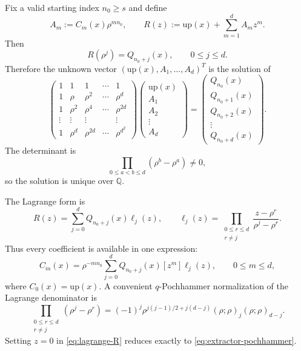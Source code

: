 \documentclass[11pt,oneside]{article}
\numberwithin{equation}{section}
\theoremstyle{definition}
\theoremstyle{remark}
\newcommand{\Q}{\mathbb{Q}}
\newcommand{\upf}{\mathrm{up}}
\begin{document}
Fix a valid starting index $n_0\ge s$ and define
\begin{equation}
 A_m:=C_m(x)\rho^{mn_0},
 \qquad
 R(z):=\upf(x)+\sum_{m=1}^{d}A_mz^m.
 \label{eq:R-polynomial}
\end{equation}
Then
\begin{equation}
 R(\rho^j)=Q_{n_0+j}(x),
 \qquad 0\le j\le d.
 \label{eq:R-samples}
\end{equation}
Therefore the unknown vector $(\upf(x),A_1,\ldots,A_d)^T$ is the solution of
\begin{equation}
 \begin{pmatrix}
 1&1&1&\cdots&1\\
 1&\rho&\rho^2&\cdots&\rho^d\\
 1&\rho^2&\rho^4&\cdots&\rho^{2d}\\
 \vdots&\vdots&\vdots&&\vdots\\
 1&\rho^d&\rho^{2d}&\cdots&\rho^{d^2}
 \end{pmatrix}
 \begin{pmatrix}
 \upf(x)\\A_1\\A_2\\\vdots\\A_d
 \end{pmatrix}
 =
 \begin{pmatrix}
 Q_{n_0}(x)\\Q_{n_0+1}(x)\\Q_{n_0+2}(x)\\\vdots\\Q_{n_0+d}(x)
 \end{pmatrix}.
 \label{eq:vandermonde-system}
\end{equation}
The determinant is
\begin{equation}
 \prod_{0\le a<b\le d}(\rho^b-\rho^a)\ne0,
 \label{eq:vandermonde-det}
\end{equation}
so the solution is unique over $\Q$.

The Lagrange form is
\begin{equation}
 R(z)=\sum_{j=0}^{d}Q_{n_0+j}(x)\ell_j(z),
 \qquad
 \ell_j(z)=\prod_{\substack{0\le r\le d\\r\ne j}}
 \frac{z-\rho^r}{\rho^j-\rho^r}.
 \label{eq:lagrange-R}
\end{equation}
Thus every coefficient is available in one expression:
\begin{equation}
 \boxed{\displaystyle
 C_m(x)=\rho^{-mn_0}
 \sum_{j=0}^{d}Q_{n_0+j}(x)[z^m]\ell_j(z),
 \qquad 0\le m\le d,}
 \label{eq:all-coefficients}
\end{equation}
where $C_0(x)=\upf(x)$.  A convenient $q$-Pochhammer normalization of the
Lagrange denominator is
\begin{equation}
 \prod_{\substack{0\le r\le d\\r\ne j}}(\rho^j-\rho^r)
 =(-1)^j\rho^{j(j-1)/2+j(d-j)}
 (\rho;\rho)_j(\rho;\rho)_{d-j}.
 \label{eq:lagrange-denominator}
\end{equation}
Setting $z=0$ in \eqref{eq:lagrange-R} reduces exactly to
\eqref{eq:extractor-pochhammer}.
\end{document}

